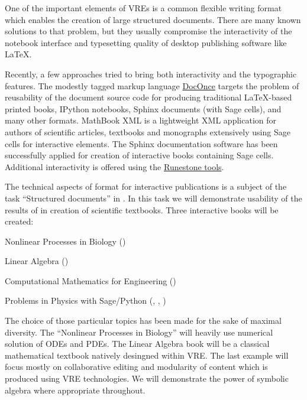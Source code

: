 \begin{workpackage}
\begin{tasklist}
\begin{task}[title=Demonstrator: Interactive books,
id=ibook,lead=US,partners={USO},PM=36,wphases={0-36,40-46}]

One of the important elements of VREs is a common flexible writing format which
enables the creation of large structured documents. There are many
known solutions to that problem, but they usually compromise the
interactivity of the notebook interface and typesetting quality of desktop
publishing software like LaTeX.

Recently, a few approaches tried to bring both interactivity and the
typographic features. The modestly tagged markup language
\href{http://hplgit.github.io/doconce/doc/web/}{DocOnce}
targets the problem of reusability of the document source code for
producing traditional LaTeX-based printed books, IPython notebooks, Sphinx
documents (with Sage cells), and many other formats. MathBook XML
is a lightweight XML application for authors of scientific articles,
textbooks and monographs extensively using Sage cells for
interactive elements. The Sphinx documentation software has been
successfully applied for creation of interactive books containing Sage
cells. Additional interactivity is offered using the \href{http://runestoneinteractive.org}{Runestone tools}.

The technical aspects of format for interactive publications is a
subject of the task ``Structured documents'' in
. In this task we will demonstrate usability
of the results of  in creation of scientific
textbooks. Three interactive books will be created:

\begin{compactitem}
\item Nonlinear Processes in Biology ()
\item Linear Algebra ()
\item Computational Mathematics for Engineering ()
\item Problems in Physics with Sage/Python (, , )
\end{compactitem}

The choice of those particular topics has been made for the sake of
maximal diversity. The ``Nonlinear Processes in Biology'' will heavily
use numerical solution of ODEs and PDEs. The Linear Algebra book will
be a classical mathematical textbook natively desingned within
VRE. The last example will focus mostly on collaborative editing and
modularity of content which is produced using VRE technologies. We
will demonstrate the power of symbolic algebra where appropriate throughout.


\end{task}
\end{tasklist}
\end{workpackage}
